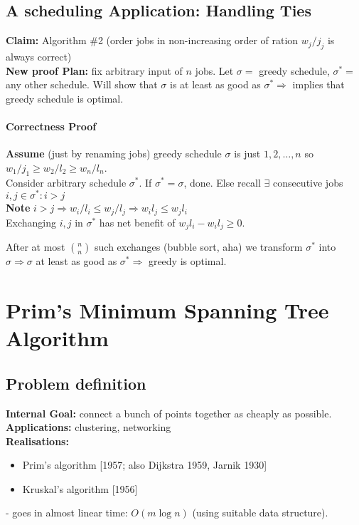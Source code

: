 \documentclass{scrartcl}
\begin{document}
\subsection{A scheduling Application: Handling Ties}
\label{sec:4-5} {\bf Claim: }Algorithm \#2 (order jobs in non-increasing order
of ration
$w_j/j_j$ is always correct)\\
{\bf New proof Plan: } fix arbitrary input of $n$ jobs. Let $\sigma=$ greedy
schedule, $\sigma^*=$ any other schedule. Will show that $\sigma$ is at least as
good as $\sigma^* \Rightarrow$ implies that greedy schedule is optimal.\\
\paragraph{Correctness Proof} {\bf Assume } (just by renaming jobs) greedy
schedule $\sigma$ is just $1, 2,
\dots, n$ so $w_1/j_1 \geq w_2/l_2 \geq w_n/l_n$.\\
Consider arbitrary schedule $\sigma^*$. If $\sigma^* = \sigma$, done. Else
recall $\exists$ consecutive jobs $i, j \in \sigma^*: i > j$\\
{\bf Note } $i>j \Rightarrow w_i/l_i \leq w_j/l_j \Rightarrow w_il_j \leq w_j
l_i$\\
Exchanging $i, j$ in $\sigma^*$ has net benefit of $w_j l_i - w_i l_j \geq 0$.

After at most $n \choose n$ such exchanges (bubble sort, aha) we transform
$\sigma^*$ into $\sigma \Rightarrow \sigma $ at least as good as $\sigma^*
\Rightarrow $ greedy is optimal.

\section{Prim's Minimum Spanning Tree Algorithm}
\label{sec:5-0}
\subsection{Problem definition}
\label{sec:5-1} {\bf Internal Goal: } connect a bunch of points together as
cheaply as
possible.\\
{\bf Applications: } clustering, networking \\
{\bf Realisations: }
\begin{itemize}
\item Prim's algorithm [1957; also Dijkstra 1959, Jarnik 1930]
\item Kruskal's algorithm [1956]
\end{itemize}
- goes in almost linear time: $O(m \log n)$ (using suitable data structure).
\end{document}
